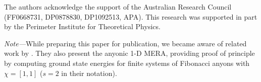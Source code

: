 \documentclass[aps,prb,reprint,superscriptaddress,amsfonts,amsmath,amssymb,showpacs,floatfix]{revtex4-1}
\newcommand{\prbtext}[1]{#1}
\newcommand{\pratext}[1]{}
\begin{document}
The authors acknowledge the support of the Australian Research Council (FF0668731, DP0878830, DP1092513, APA). This research was supported in part by the Perimeter Institute for Theoretical Physics.

\emph{Note---}While preparing this paper for publication, we became aware of related work by \citeauthor{konig2010}\pratext{ }\prbtext{.}\cite{konig2010}\pratext{.} They also present the anyonic {1-D} MERA, providing proof of principle by
computing ground state energies for finite systems of Fibonacci anyons with $\chi=[1,1]$ ($s=2$ in their notation). 

%
%


\end{document}
